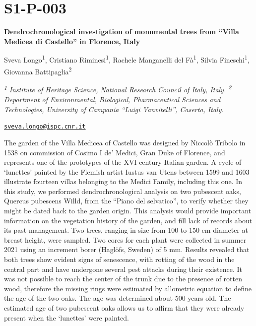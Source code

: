 \documentclass[
]{book}
\begin{document}
\hypertarget{s1-p-003}{%
\section*{S1-P-003}\label{s1-p-003}}

\textbf{Dendrochronological investigation of monumental trees from ``Villa Medicea di Castello'' in Florence, Italy}

Sveva Longo\textsuperscript{1}, Cristiano Riminesi\textsuperscript{1}, Rachele Manganelli del Fà\textsuperscript{1}, Silvia Fineschi\textsuperscript{1}, Giovanna Battipaglia\textsuperscript{2}

\textsuperscript{\emph{1}} \emph{Institute of Heritage Science, National Research Council of Italy, Italy. \textsuperscript{2} Department of Environmental, Biological, Pharmaceutical Sciences and Technologies, University of Campania ``Luigi Vanvitelli'', Caserta, Italy.}

\href{mailto:sveva.longo@ispc.cnr.it}{\nolinkurl{sveva.longo@ispc.cnr.it}}

The garden of the Villa Medicea of Castello was designed by Niccolò Tribolo in 1538 on commission of Cosimo I de' Medici, Gran Duke of Florence, and represents one of the prototypes of the XVI century Italian garden. A cycle of `lunettes' painted by the Flemish artist Iustus van Utens between 1599 and 1603 illustrate fourteen villas belonging to the Medici Family, including this one. In this study, we performed dendrochronological analysis on two pubescent oaks, Quercus pubescens Willd, from the ``Piano del selvatico'', to verify whether they might be dated back to the garden origin. This analysis would provide important information on the vegetation history of the garden, and fill lack of records about its past management. Two trees, ranging in size from 100 to 150 cm diameter at breast height, were sampled. Two cores for each plant were collected in summer 2021 using an increment borer (Haglöfs, Sweden) of 5 mm. Results revealed that both trees show evident signs of senescence, with rotting of the wood in the central part and have undergone several pest attacks during their existence. It was not possible to reach the center of the trunk due to the presence of rotten wood, therefore the missing rings were estimated by allometric equation to define the age of the two oaks. The age was determined about 500 years old. The estimated age of two pubescent oaks allows us to affirm that they were already present when the `lunettes' were painted.
\end{document}
